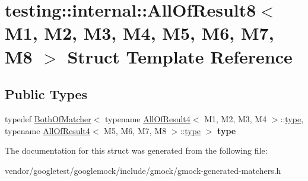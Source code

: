 \hypertarget{structtesting_1_1internal_1_1AllOfResult8}{}\section{testing\+:\+:internal\+:\+:All\+Of\+Result8$<$ M1, M2, M3, M4, M5, M6, M7, M8 $>$ Struct Template Reference}
\label{structtesting_1_1internal_1_1AllOfResult8}
\subsection*{Public Types}
\begin{DoxyCompactItemize}
\item 
typedef \hyperlink{classtesting_1_1internal_1_1BothOfMatcher}{Both\+Of\+Matcher}$<$ typename \hyperlink{structtesting_1_1internal_1_1AllOfResult4}{All\+Of\+Result4}$<$ M1, M2, M3, M4 $>$\+::\hyperlink{classtesting_1_1internal_1_1BothOfMatcher}{type}, typename \hyperlink{structtesting_1_1internal_1_1AllOfResult4}{All\+Of\+Result4}$<$ M5, M6, M7, M8 $>$\+::\hyperlink{classtesting_1_1internal_1_1BothOfMatcher}{type} $>$ {\bfseries type}\hypertarget{structtesting_1_1internal_1_1AllOfResult8_a7103892a28c35221b9e62e871c577727}{}\label{structtesting_1_1internal_1_1AllOfResult8_a7103892a28c35221b9e62e871c577727}

\end{DoxyCompactItemize}


The documentation for this struct was generated from the following file\+:\begin{DoxyCompactItemize}
\item 
vendor/googletest/googlemock/include/gmock/gmock-\/generated-\/matchers.\+h\end{DoxyCompactItemize}
